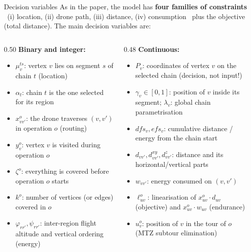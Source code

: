 \documentclass[aspectratio=169,10pt]{beamer}
\begin{document}
\begin{frame}{Decision variables}
  {\small As in the paper, the model has \textbf{four families of constraints}
  \textemdash\ (i) location, (ii) drone path, (iii) distance, (iv) consumption \textemdash\ plus the
  objective (total distance). The main decision variables are:}
  \vspace{0.12cm}
  \begin{columns}[T,onlytextwidth]
    \begin{column}{0.50\textwidth}
      {\small \textbf{Binary and integer:}}
      \begin{itemize}
        \item $\mu_v^{ts}$: vertex $v$ lies on segment $s$ of chain $t$ (location)
        \item $\alpha_t$: chain $t$ is the one selected for its region
        \item $x_{vv'}^o$: the drone traverses $(v,v')$ in operation $o$ (routing)
        \item $y_v^o$: vertex $v$ is visited during operation $o$
        \item $\zeta^o$: everything is covered before operation $o$ starts
        \item $k^o$: number of vertices (or edges) covered in $o$
        \item $\varphi_{rr'},\psi_{rr'}$: inter-region flight altitude and vertical ordering (energy)
      \end{itemize}
    \end{column}
    \begin{column}{0.48\textwidth}
      {\small \textbf{Continuous:}}
      \begin{itemize}
        \item $P_v$: coordinates of vertex $v$ on the selected chain (decision, not input!)
        \item $\gamma_v \in [0,1]$: position of $v$ inside its segment; $\lambda_v$: global chain parametrisation
        \item $dfs_v, efs_v$: cumulative distance / energy from the chain start
        \item $d_{vv'}, d_{vv'}^{xy}, d_{vv'}^{z}$: distance and its horizontal/vertical parts
        \item $w_{vv'}$: energy consumed on $(v,v')$
        \item $\ell_{uv}^o$: linearisation of $x_{uv}^o\cdot d_{uv}$ (objective) and $x_{uv}^o\cdot w_{uv}$ (endurance)
        \item $u_v^o$: position of $v$ in the tour of $o$ (MTZ subtour elimination)
      \end{itemize}
    \end{column}
  \end{columns}
\end{frame}
\end{document}
